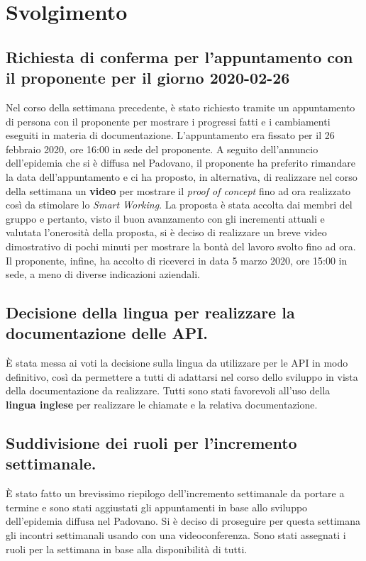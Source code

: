 \newpage
\section*{Svolgimento}

	\subsection*{Richiesta di conferma per l'appuntamento con il proponente per il giorno 2020-02-26}
		Nel corso della settimana precedente, è stato richiesto tramite  un appuntamento di persona con il proponente per mostrare i progressi fatti e i cambiamenti eseguiti in materia di documentazione. L'appuntamento era fissato per il 26 febbraio 2020, ore 16:00 in sede del proponente. A seguito dell'annuncio dell'epidemia che si è diffusa nel Padovano, il proponente ha preferito rimandare la data dell'appuntamento e ci ha proposto, in alternativa, di realizzare nel corso della settimana un \textbf{video} per mostrare il \textit{proof of concept} fino ad ora realizzato così da stimolare lo \textit{Smart Working}. La proposta è stata accolta dai membri del gruppo e pertanto, visto il buon avanzamento con gli incrementi attuali e valutata l'onerosità della proposta, si è deciso di realizzare un breve video dimostrativo di pochi minuti per mostrare la bontà del lavoro svolto fino ad ora. Il proponente, infine, ha accolto di riceverci in data 5 marzo 2020, ore 15:00 in sede, a meno di diverse indicazioni aziendali.

	\subsection*{Decisione della lingua per realizzare la documentazione delle API.}
		È stata messa ai voti la decisione sulla lingua da utilizzare per le API in modo definitivo, così da permettere a tutti di adattarsi nel corso dello sviluppo in vista della documentazione da realizzare. Tutti sono stati favorevoli all'uso della \textbf{lingua inglese} per realizzare le chiamate e la relativa documentazione.

	\subsection*{Suddivisione dei ruoli per l'incremento settimanale.}
		È stato fatto un brevissimo riepilogo dell'incremento settimanale da portare a termine e sono stati aggiustati gli appuntamenti in base allo sviluppo dell'epidemia diffusa nel Padovano. Si è deciso di proseguire per questa settimana gli incontri settimanali usando  con una videoconferenza. Sono stati assegnati i ruoli per la settimana in base alla disponibilità di tutti.

